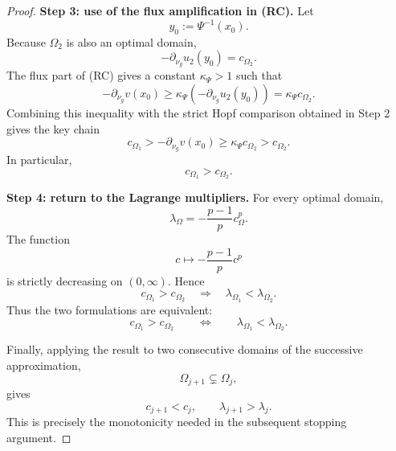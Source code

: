 \documentclass[10pt,a4paper]{amsart}
\begin{document}
\begin{proof}
\medskip
\noindent\textbf{Step 3: use of the flux amplification in {\rm (RC)}.}
Let
\[
y_0:=\Psi^{-1}(x_0).
\]
Because $\Omega_2$ is also an optimal domain,
\[
-\partial_{\nu_g}u_2(y_0)=c_{\Omega_2}.
\]
The flux part of {\rm (RC)} gives a constant $\kappa_\Psi>1$ such that
\[
-\partial_{\nu_g}v(x_0)
\geq
\kappa_\Psi
\left(
-\partial_{\nu_g}u_2(y_0)
\right)
=
\kappa_\Psi c_{\Omega_2}.
\]
Combining this inequality with the strict Hopf comparison obtained in
Step 2 gives the key chain
\[
c_{\Omega_1}
>
-\partial_{\nu_g}v(x_0)
\geq
\kappa_\Psi c_{\Omega_2}
>
c_{\Omega_2}.
\]
In particular,
\[
c_{\Omega_1}>c_{\Omega_2}.
\]

\medskip
\noindent\textbf{Step 4: return to the Lagrange multipliers.}
For every optimal domain,
\[
\lambda_\Omega
=
-\frac{p-1}{p}c_\Omega^p.
\]
The function
\[
c\longmapsto-\frac{p-1}{p}c^p
\]
is strictly decreasing on $(0,\infty)$. Hence
\[
c_{\Omega_1}>c_{\Omega_2}
\quad\Longrightarrow\quad
\lambda_{\Omega_1}<\lambda_{\Omega_2}.
\]
Thus the two formulations are equivalent:
\[
c_{\Omega_1}>c_{\Omega_2}
\qquad\Longleftrightarrow\qquad
\lambda_{\Omega_1}<\lambda_{\Omega_2}.
\]

Finally, applying the result to two consecutive domains of the
successive approximation,
\[
\Omega_{j+1}\subsetneq\Omega_j,
\]
gives
\[
c_{j+1}<c_j,
\qquad
\lambda_{j+1}>\lambda_j.
\]
This is precisely the monotonicity needed in the subsequent stopping
argument.
\end{proof}
\end{document}
